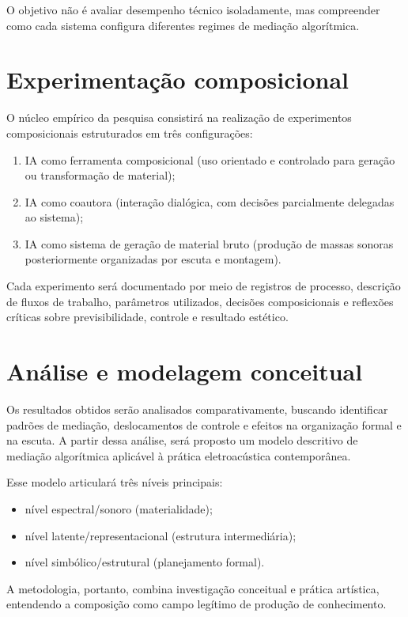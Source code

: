 O objetivo não é avaliar desempenho técnico isoladamente, mas compreender como cada sistema configura diferentes regimes de mediação algorítmica.

\section{Experimentação composicional}

O núcleo empírico da pesquisa consistirá na realização de experimentos composicionais estruturados em três configurações:

\begin{enumerate}
  \item IA como ferramenta composicional (uso orientado e controlado para geração ou transformação de material);
  \item IA como coautora (interação dialógica, com decisões parcialmente delegadas ao sistema);
  \item IA como sistema de geração de material bruto (produção de massas sonoras posteriormente organizadas por escuta e montagem).
\end{enumerate}

Cada experimento será documentado por meio de registros de processo, descrição de fluxos de trabalho, parâmetros utilizados, decisões composicionais e reflexões críticas sobre previsibilidade, controle e resultado estético.

\section{Análise e modelagem conceitual}

Os resultados obtidos serão analisados comparativamente, buscando identificar padrões de mediação, deslocamentos de controle e efeitos na organização formal e na escuta. A partir dessa análise, será proposto um modelo descritivo de mediação algorítmica aplicável à prática eletroacústica contemporânea.

Esse modelo articulará três níveis principais:

\begin{itemize}
  \item nível espectral/sonoro (materialidade);
  \item nível latente/representacional (estrutura intermediária);
  \item nível simbólico/estrutural (planejamento formal).
\end{itemize}

A metodologia, portanto, combina investigação conceitual e prática artística, entendendo a composição como campo legítimo de produção de conhecimento.


